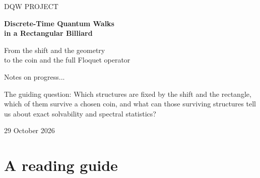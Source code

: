 \documentclass[11pt,a4paper,oneside]{report}
\numberwithin{equation}{chapter}
\begin{document}
\hypersetup{pageanchor=false}
\begin{titlepage}
\vspace*{18mm}
{\color{accent}\large DQW PROJECT\par}
\vspace{12mm}
{\color{ink}\Huge\bfseries Discrete-Time Quantum Walks\\[3mm]
in a Rectangular Billiard\par}
\vspace{10mm}
{\Large From the shift and the geometry\\
to the coin and the full Floquet operator\par}
\vspace{16mm}
{\large Notes on progress...\par}
\vspace{3mm}
\vfill
\begin{lesson}{The guiding question:}
Which structures are fixed by the shift and the rectangle, which of
them survive a chosen coin, and what can those surviving structures
tell us about exact solvability and spectral statistics?
\end{lesson}
\vspace{10mm}
29 October 2026
\end{titlepage}
\hypersetup{pageanchor=true}

\chapter*{A reading guide}
\end{document}

